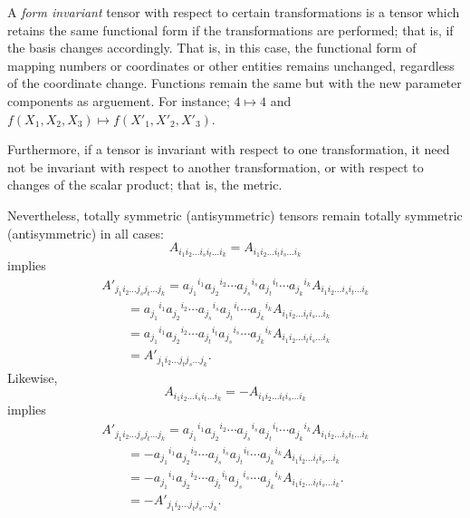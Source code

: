 A {\em form invariant} tensor with respect to  certain transformations
is a tensor which retains
the same functional form if the transformations are performed; that is,
if the basis changes accordingly.
That is, in this case,
the functional form of mapping numbers or coordinates or other entities remains unchanged, regardless of the coordinate change.
Functions remain the same but with the new parameter components as
arguement. For instance; $4\mapsto 4$ and $f(X_1,X_2,X_3)\mapsto
f(X'_1,X'_2,X'_3)$.

Furthermore, if a tensor is invariant with respect to one transformation, it need not
be invariant with respect to another transformation, or with respect to
changes of the scalar product; that is, the metric.

Nevertheless, totally symmetric (antisymmetric) tensors remain totally
symmetric (antisymmetric) in all cases:
$$
A_{i_1i_2 \ldots i_si_t\ldots i_k}
=
A_{i_1i_2 \ldots i_ti_s\ldots i_k}
$$
implies
$$
\begin{array}{l}
A'_{j_1i_2 \ldots j_s j_t\ldots j_k}
=
{a_{j_1}}^{i_1}{a_{j_2}}^{i_2}\cdots
{a_{j_s}}^{i_s}{a_{j_t}}^{i_t}\cdots
{a_{j_k}}^{i_k} A_{i_1 i_2\ldots i_s i_t\ldots  i_k}
 \\  \qquad
=
{a_{j_1}}^{i_1}{a_{j_2}}^{i_2}\cdots
{a_{j_s}}^{i_s}{a_{j_t}}^{i_t}\cdots
{a_{j_k}}^{i_k} A_{i_1 i_2\ldots i_t i_s\ldots  i_k}
  \\  \qquad
=
{a_{j_1}}^{i_1}{a_{j_2}}^{i_2}\cdots
{a_{j_t}}^{i_t}{a_{j_s}}^{i_s}\cdots
{a_{j_k}}^{i_k} A_{i_1 i_2\ldots i_t i_s\ldots  i_k}
  \\  \qquad
=
A'_{j_1i_2 \ldots j_t j_s\ldots j_k}    .
\end{array}
$$
Likewise,
$$
A_{i_1i_2 \ldots i_si_t\ldots i_k}
=
-A_{i_1i_2 \ldots i_ti_s\ldots i_k}
$$
implies
$$
\begin{array}{l}
A'_{j_1i_2 \ldots j_s j_t\ldots j_k}
=
{a_{j_1}}^{i_1}{a_{j_2}}^{i_2}\cdots
{a_{j_s}}^{i_s}{a_{j_t}}^{i_t}\cdots
{a_{j_k}}^{i_k} A_{i_1 i_2\ldots i_s i_t\ldots  i_k}
 \\  \qquad
=
-{a_{j_1}}^{i_1}{a_{j_2}}^{i_2}\cdots
{a_{j_s}}^{i_s}{a_{j_t}}^{i_t}\cdots
{a_{j_k}}^{i_k} A_{i_1 i_2\ldots i_t i_s\ldots  i_k}
 \\ \qquad
=
-{a_{j_1}}^{i_1}{a_{j_2}}^{i_2}\cdots
{a_{j_t}}^{i_t}{a_{j_s}}^{i_s}\cdots
{a_{j_k}}^{i_k} A_{i_1 i_2\ldots i_t i_s\ldots  i_k}.
  \\  \qquad
=
-A'_{j_1i_2 \ldots j_t j_s\ldots j_k}  .
\end{array}
$$


